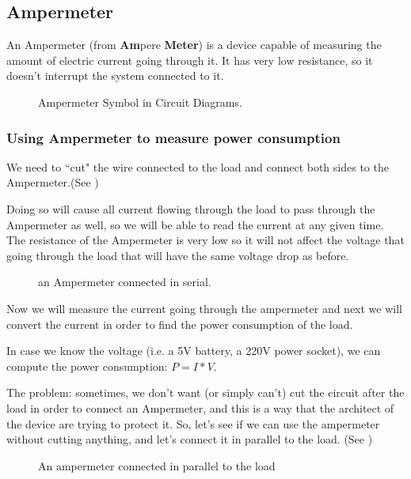 \subsection{Ampermeter}

An Ampermeter (from \textbf{Am}pere \textbf{Meter}) is a device capable of measuring the amount of electric current going through it. It has very low resistance, so it doesn't interrupt the system connected to it.

\begin{figure}[!ht]
    \centering
    
    \caption{Ampermeter Symbol in Circuit Diagrams.} \label{fig:ampermeter}
\end{figure}

\subsubsection{Using Ampermeter to measure power consumption}

We need to ``cut" the wire connected to the load and connect both sides to the Ampermeter.(See )

Doing so will cause all current flowing through the load to pass through the Ampermeter as well, so we will be able to read the current at any given time. The resistance of the Ampermeter is very low so it will not affect the voltage that going through the load that will have the same voltage drop as before. 

\begin{figure}[!ht]
    \centering
    
    \caption{an Ampermeter connected in serial.} \label{fig:circuit5}
\end{figure}

Now we will measure the current going through the ampermeter and next we will convert the current in order to find the power consumption of the load.

In case we know the voltage (i.e. a 5V battery, a 220V power socket), we can compute the power consumption: $P=I*V$.

The problem: sometimes, we don't want (or simply can't) cut the circuit after the load in order to connect an Ampermeter, and this is a way that the architect of the device are trying to protect it. So, let's see if we can use the ampermeter without cutting anything, and let's connect it in parallel to the load. (See )

\begin{figure}[!ht]
    \centering
    
    \caption{An ampermeter connected in parallel to the load} \label{fig:circuit6}
\end{figure}

